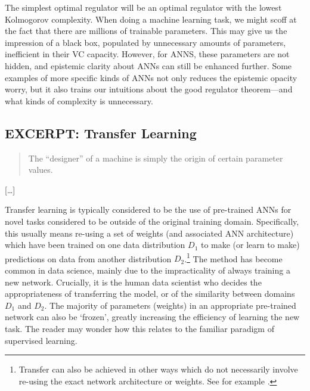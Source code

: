 \documentclass[11pt, oneside]{article}   	%
\begin{document}



The simplest optimal regulator will be an optimal regulator with the lowest Kolmogorov complexity.  When doing a machine learning task, we might scoff at the fact that there are millions of trainable parameters.  This may give us the impression of a black box, populated by unnecessary amounts of parameters, inefficient in their VC capacity.  However, for ANNS, these parameters are not hidden, and epistemic clarity about ANNs can still be enhanced further.  Some examples of more specific kinds of ANNs not only reduces the epistemic opacity worry, but it also trains our intuitions about the good regulator theorem---and what kinds of complexity is unnecessary.  

\subsection{EXCERPT: Transfer Learning}

\begin{quote}
The ``designer'' of a machine is simply the origin of certain parameter values.  \cite[p. 4448]{AshbyJournal}
\end{quote}

[\dots]

Transfer learning is typically considered to be the use of pre-trained ANNs for novel tasks considered to be outside of the original training domain.  Specifically, this usually means re-using a set of weights (and associated ANN architecture) which have been trained on one data distribution $D_1$ to make (or learn to make) predictions on data from another distribution $D_2$.\footnote{Transfer can also be achieved in other ways which do not necessarily involve re-using the exact network architecture or weights.  See for example \citet{Pratt1991}.}  The method has become common in data science, mainly due to the impracticality of always training a new network.  Crucially, it is the human data scientist who decides the appropriateness of transferring the model, or of the similarity between domains $D_1$ and $D_2$.  The majority of parameters (weights) in an appropriate pre-trained network can also be `frozen', greatly increasing the efficiency of learning the new task.  The reader may wonder how this relates to the familiar paradigm of supervised learning.  
\end{document}
